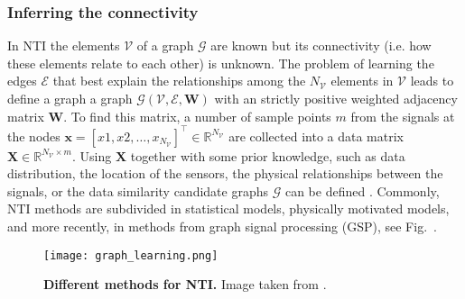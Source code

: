 \subsubsection{Inferring the connectivity}
In NTI the elements $\mathcal{V}$ of a graph $\mathcal{G}$ are known but its connectivity (i.e. how these elements relate to each other) is unknown. %
The problem of learning the edges $\mathcal{E}$ that best explain the relationships among the $N_\mathcal{V}$ elements in $\mathcal{V}$ leads to define a graph a graph $\mathcal{G}\left(\mathcal{V},\mathcal{E},\bm{W}\right)$ with an strictly positive weighted adjacency matrix $\bm{W}$. To find this matrix, a number of sample points $m$ from the signals at the nodes $\bm{x} = [x1,x2,\ldots, x_{N_\mathcal{V}}]^\intercal \in \mathbb{R}^{N_\mathcal{V}}$ are collected into a data matrix $\bm{X} \in \mathbb{R}^{N_\mathcal{V} \times m}$. Using $\bm{X}$ together with some prior knowledge, such as  data distribution, the location of the sensors, the physical relationships between the signals, or the data similarity candidate graphs $\mathcal{G}$ can be defined \cite{Dong2019Learninggraphsdata,Stankovic2019Introductiongraphsignal}. Commonly, NTI methods are subdivided in statistical models, physically motivated models, and more recently, in methods from graph signal processing (GSP), see Fig.~. 
\begin{figure*}[!t]
	\centering	
	\hspace*{\fill}
	\texttt{[image: graph\_learning.png]}
	\hspace*{\fill}	
	\caption[] {\label{fig:graph_learning}\textbf{Different methods for NTI.} Image taken from \cite{Dong2019Learninggraphsdata}.}
\end{figure*}
